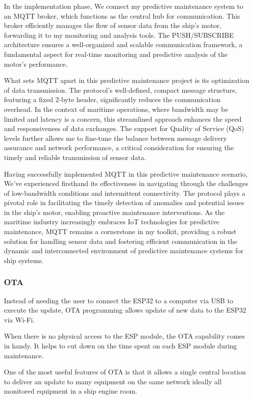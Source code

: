 In the implementation phase, We connect my predictive maintenance system to an MQTT broker, which functions as the central hub for communication. This broker efficiently manages the flow of sensor data from the ship's motor, forwarding it to my monitoring and analysis tools. The PUSH/SUBSCRIBE architecture ensures a well-organized and scalable communication framework, a fundamental aspect for real-time monitoring and predictive analysis of the motor's performance.

What sets MQTT apart in this predictive maintenance project is its optimization of data transmission. The protocol's well-defined, compact message structure, featuring a fixed 2-byte header, significantly reduces the communication overhead. In the context of maritime operations, where bandwidth may be limited and latency is a concern, this streamlined approach enhances the speed and responsiveness of data exchanges. The support for Quality of Service (QoS) levels further allows me to fine-tune the balance between message delivery assurance and network performance, a critical consideration for ensuring the timely and reliable transmission of sensor data.

Having successfully implemented MQTT in this predictive maintenance scenario, We've experienced firsthand its effectiveness in navigating through the challenges of low-bandwidth conditions and intermittent connectivity. The protocol plays a pivotal role in facilitating the timely detection of anomalies and potential issues in the ship's motor, enabling proactive maintenance interventions. As the maritime industry increasingly embraces IoT technologies for predictive maintenance, MQTT remains a cornerstone in my toolkit, providing a robust solution for handling sensor data and fostering efficient communication in the dynamic and interconnected environment of predictive maintenance systems for ship systems.


\subsubsection{OTA}

Instead of needing the user to connect the ESP32 to a computer via USB to execute the update, OTA programming allows update of new data to the ESP32 via Wi-Fi.

When there is no physical access to the ESP module, the OTA capability comes in handy. It helps to cut down on the time spent on each ESP module during maintenance.

One of the most useful features of OTA is that it allows a single central location to deliver an update to many equipment on the same network ideally all monitored equipment in a ship engine room.

